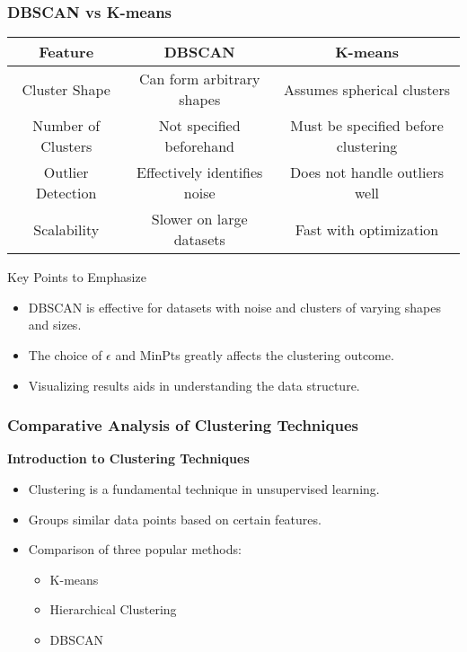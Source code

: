 \documentclass[aspectratio=169]{beamer}
\begin{document}
\begin{frame}[fragile]
    \frametitle{DBSCAN vs K-means}
    \begin{table}[ht]
        \begin{center}
            \begin{tabular}{|c|c|c|}
                \hline
                \textbf{Feature} & \textbf{DBSCAN} & \textbf{K-means} \\
                \hline
                Cluster Shape & Can form arbitrary shapes & Assumes spherical clusters \\
                \hline
                Number of Clusters & Not specified beforehand & Must be specified before clustering \\
                \hline
                Outlier Detection & Effectively identifies noise & Does not handle outliers well \\
                \hline
                Scalability & Slower on large datasets & Fast with optimization \\
                \hline
            \end{tabular}
        \end{center}
    \end{table}
    
    \begin{block}{Key Points to Emphasize}
        \begin{itemize}
            \item DBSCAN is effective for datasets with noise and clusters of varying shapes and sizes.
            \item The choice of $\epsilon$ and MinPts greatly affects the clustering outcome.
            \item Visualizing results aids in understanding the data structure.
        \end{itemize}
    \end{block}
\end{frame}

\begin{frame}[fragile]
    \frametitle{Comparative Analysis of Clustering Techniques}
    \textbf{Introduction to Clustering Techniques}
    \begin{itemize}
        \item Clustering is a fundamental technique in unsupervised learning.
        \item Groups similar data points based on certain features.
        \item Comparison of three popular methods:
        \begin{itemize}
            \item K-means
            \item Hierarchical Clustering
            \item DBSCAN
        \end{itemize}
    \end{itemize}
\end{frame}
\end{document}
